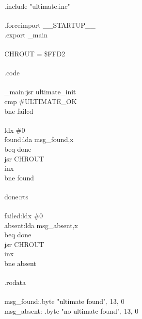 \begin{listingbox}
\hspace*{2em}.include "ultimate.inc"\\
\\
\hspace*{2em}.forceimport \_\_STARTUP\_\_\\
\hspace*{2em}.export \_main\\
\\
CHROUT = \$FFD2\\
\\
\hspace*{2em}.code\\
\\
\_main:\hspace*{1em}jsr ultimate\_init\\
\hspace*{2em}cmp \#ULTIMATE\_OK\\
\hspace*{2em}bne failed\\
\\
\hspace*{2em}ldx \#0\\
found:\hspace*{1em}lda msg\_found,x\\
\hspace*{2em}beq done\\
\hspace*{2em}jsr CHROUT\\
\hspace*{2em}inx\\
\hspace*{2em}bne found\\
\\
done:\hspace*{2em}rts\\
\\
failed:\hspace*{1em}ldx \#0\\
absent:\hspace*{1em}lda msg\_absent,x\\
\hspace*{2em}beq done\\
\hspace*{2em}jsr CHROUT\\
\hspace*{2em}inx\\
\hspace*{2em}bne absent\\
\\
\hspace*{2em}.rodata\\
\\
msg\_found:\hspace*{1em}.byte "ultimate found", 13, 0\\
msg\_absent: .byte "no ultimate found", 13, 0
\end{listingbox}

